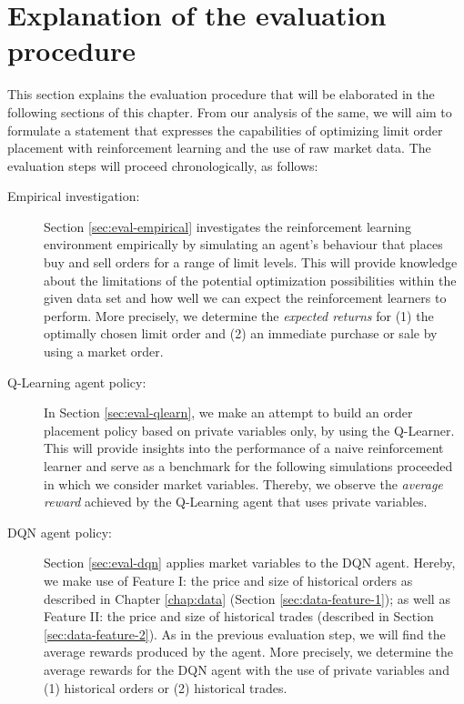 \section{Explanation of the evaluation procedure}
\label{sec:analysis-procedure}
This section explains the evaluation procedure that will be elaborated in the following sections of this chapter. From our analysis of the same, we will aim to formulate a statement that expresses the capabilities of optimizing limit order placement with reinforcement learning and the use of raw market data.
The evaluation steps will proceed chronologically, as follows:
\begin{description}
    \item[Empirical investigation: ]
    Section \ref{sec:eval-empirical} investigates the reinforcement learning environment empirically by simulating an agent's behaviour that places buy and sell orders for a range of limit levels.
    This will provide knowledge about the limitations of the potential optimization possibilities within the given data set and how well we can expect the reinforcement learners to perform.
    More precisely, we determine the \textit{expected returns} for (1) the optimally chosen limit order and (2) an immediate purchase or sale by using a market order.
    
    \item[Q-Learning agent policy: ]
    In Section \ref{sec:eval-qlearn}, we make an attempt to build an order placement policy based on private variables only, by using the Q-Learner.
    This will provide insights into the performance of a naive reinforcement learner and serve as a benchmark for the following simulations proceeded in which we consider market variables.
    Thereby, we observe the \textit{average reward} achieved by the Q-Learning agent that uses private variables.

    \item[DQN agent policy: ]
    Section \ref{sec:eval-dqn} applies market variables to the DQN agent.
    Hereby, we make use of Feature I: the price and size of historical orders as described in Chapter \ref{chap:data} (Section \ref{sec:data-feature-1}); as well as Feature II: the price and size of historical trades (described in Section \ref{sec:data-feature-2}).
    As in the previous evaluation step, we will find the average rewards produced by the agent.
    More precisely, we determine the average rewards for the DQN agent with the use of private variables and (1) historical orders or (2) historical trades.


\end{description}
